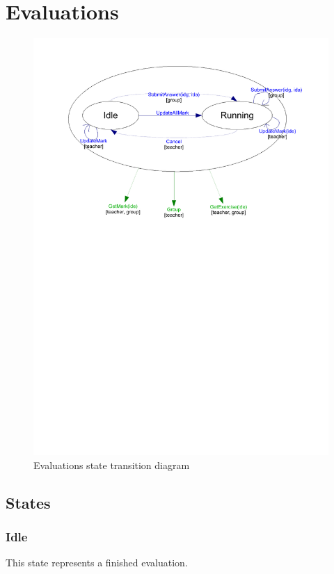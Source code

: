 \section{Evaluations}
	\begin{figure}[ht]
			\begin{center}
				\includegraphics[width=\textwidth,  trim=2cm 16cm 2cm 1cm]{UML_figure/state_transition/dojo_logic/st_evaluations.pdf}
				\caption{Evaluations state transition diagram}
			\end{center}
	\end{figure}
	\subsection{States}
		\subsubsection{Idle}
			This state represents a finished evaluation.
